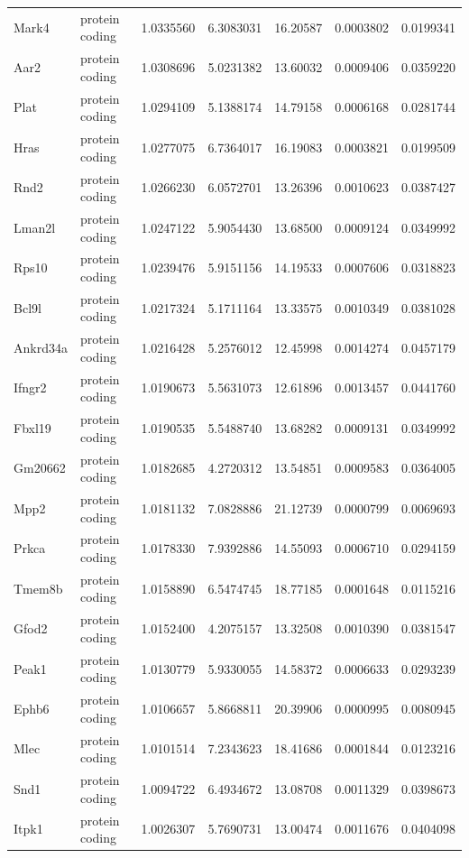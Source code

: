 \documentclass[onehalf,12pt]{beavtex}
\begin{document}
\begin{longtable}{llrrrrr}
  Mark4 & protein coding & 1.0335560 & 6.3083031 & 16.20587 & 0.0003802 & 0.0199341\\
  \addlinespace
  Aar2 & protein coding & 1.0308696 & 5.0231382 & 13.60032 & 0.0009406 & 0.0359220\\
  Plat & protein coding & 1.0294109 & 5.1388174 & 14.79158 & 0.0006168 & 0.0281744\\
  Hras & protein coding & 1.0277075 & 6.7364017 & 16.19083 & 0.0003821 & 0.0199509\\
  Rnd2 & protein coding & 1.0266230 & 6.0572701 & 13.26396 & 0.0010623 & 0.0387427\\
  Lman2l & protein coding & 1.0247122 & 5.9054430 & 13.68500 & 0.0009124 & 0.0349992\\
  \addlinespace
  Rps10 & protein coding & 1.0239476 & 5.9151156 & 14.19533 & 0.0007606 & 0.0318823\\
  Bcl9l & protein coding & 1.0217324 & 5.1711164 & 13.33575 & 0.0010349 & 0.0381028\\
  Ankrd34a & protein coding & 1.0216428 & 5.2576012 & 12.45998 & 0.0014274 & 0.0457179\\
  Ifngr2 & protein coding & 1.0190673 & 5.5631073 & 12.61896 & 0.0013457 & 0.0441760\\
  Fbxl19 & protein coding & 1.0190535 & 5.5488740 & 13.68282 & 0.0009131 & 0.0349992\\
  \addlinespace
  Gm20662 & protein coding & 1.0182685 & 4.2720312 & 13.54851 & 0.0009583 & 0.0364005\\
  Mpp2 & protein coding & 1.0181132 & 7.0828886 & 21.12739 & 0.0000799 & 0.0069693\\
  Prkca & protein coding & 1.0178330 & 7.9392886 & 14.55093 & 0.0006710 & 0.0294159\\
  Tmem8b & protein coding & 1.0158890 & 6.5474745 & 18.77185 & 0.0001648 & 0.0115216\\
  Gfod2 & protein coding & 1.0152400 & 4.2075157 & 13.32508 & 0.0010390 & 0.0381547\\
  \addlinespace
  Peak1 & protein coding & 1.0130779 & 5.9330055 & 14.58372 & 0.0006633 & 0.0293239\\
  Ephb6 & protein coding & 1.0106657 & 5.8668811 & 20.39906 & 0.0000995 & 0.0080945\\
  Mlec & protein coding & 1.0101514 & 7.2343623 & 18.41686 & 0.0001844 & 0.0123216\\
  Snd1 & protein coding & 1.0094722 & 6.4934672 & 13.08708 & 0.0011329 & 0.0398673\\
  Itpk1 & protein coding & 1.0026307 & 5.7690731 & 13.00474 & 0.0011676 & 0.0404098\\

\end{longtable}
\end{document}
